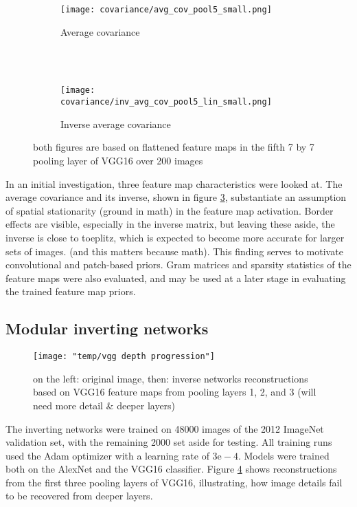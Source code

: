 \documentclass{article}
\begin{document}
\begin{figure}
	\centering
	\begin{subfigure}[b]{0.3\textwidth}
		\texttt{[image: covariance/avg\_cov\_pool5\_small.png]}
		\caption{Average covariance \\~}
		\label{fig:cov}
	\end{subfigure}
	~
	\begin{subfigure}[b]{0.3\textwidth}
		\texttt{[image: covariance/inv\_avg\_cov\_pool5\_lin\_small.png]}
		\caption{Inverse average covariance}
		\label{fig:inv_cov}
	\end{subfigure}
	\caption{both figures are based on flattened feature maps in the fifth 7 by 7 pooling layer of VGG16 over 200 images}
	\label{fig:cov_plots}
\end{figure}

In an initial investigation, three feature map characteristics were looked at. The average covariance and its inverse, shown in figure \ref{fig:cov_plots}, substantiate an assumption of spatial stationarity (ground in math) in the feature map activation. Border effects are visible, especially in the inverse matrix, but leaving these aside, the inverse is close to toeplitz, which is expected to become more accurate for larger sets of images. (and this matters because math). This finding serves to motivate convolutional and patch-based priors. Gram matrices and sparsity statistics of the feature maps were also evaluated, and may be used at a later stage in evaluating the trained feature map priors.

\subsection{Modular inverting networks}

\begin{figure}
	\centering
	\texttt{[image: "temp/vgg depth progression"]}
	\caption{on the left: original image, then: inverse networks reconstructions based on VGG16 feature maps from pooling layers 1, 2, and 3 (will need more detail \& deeper layers)}
	\label{fig:invert_net_progression}
\end{figure}

The inverting networks were trained on 48000 images of the 2012 ImageNet validation set, with the remaining 2000 set aside for testing. All training runs used the Adam optimizer \cite{adam} with a learning rate of $3\mathrm{e-}4$. Models were trained both on the AlexNet and the VGG16 classifier.  Figure \ref{fig:invert_net_progression} shows reconstructions from the first three pooling layers of VGG16, illustrating, how image details fail to be recovered from deeper layers.
\end{document}
